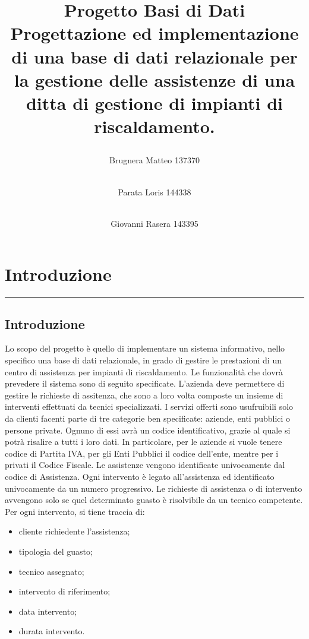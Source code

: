 \documentclass[legalpaper]{article}
\begin{document}
\title{%
\raggedright Progetto Basi di Dati \\ \large \bigskip Progettazione ed implementazione di una base di dati relazionale per la gestione delle assistenze di una ditta di gestione di impianti di riscaldamento.}
\maketitle

\begin{flushleft}
\author{Brugnera Matteo 137370 \and \\ Parata Loris 144338 \and \\ Giovanni Rasera 143395}

\end{flushleft}

\newpage
\tableofcontents

\newpage
\section{Introduzione}
\rule{\linewidth}{1.5pt}
\subsection{Introduzione}
Lo scopo del progetto è quello di implementare un sistema informativo, nello specifico una base di dati relazionale, in grado di gestire le prestazioni di un centro di assistenza per impianti di riscaldamento. 
Le funzionalità che dovrà prevedere il sistema sono di seguito specificate.
L'azienda deve permettere di gestire le richieste di assitenza, che sono a loro volta composte un insieme di interventi effettuati da tecnici specializzati.
I servizi offerti sono usufruibili solo da clienti facenti parte di tre categorie ben specificate: aziende, enti pubblici o persone private.
Ognuno di essi avrà un codice identificativo, grazie al quale si potrà risalire a tutti i loro dati. 
In particolare, per le aziende si vuole tenere codice di Partita IVA, per gli Enti Pubblici il codice dell'ente, mentre per i privati il Codice Fiscale.
Le assistenze vengono identificate univocamente dal codice di Assistenza. Ogni intervento è legato all'assistenza ed identificato univocamente da un numero progressivo. 
Le richieste di assistenza o di intervento avvengono solo se quel determinato guasto è risolvibile da un tecnico competente.\\
Per ogni intervento, si tiene traccia di:
\medskip
\begin{itemize}
    \item cliente richiedente l'assistenza;
    \item tipologia del guasto;
    \item tecnico assegnato;
    \item intervento di riferimento;
    \item data intervento;
    \item durata intervento.
\end{itemize}
\end{document}
